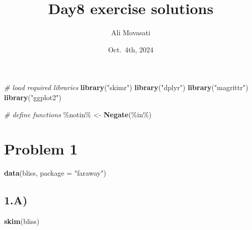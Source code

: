 \documentclass[
]{article}
\title{Day8 exercise solutions}
\author{Ali Movasati}
\date{Oct.~4th, 2024}
\newenvironment{Shaded}{\begin{snugshade}}{\end{snugshade}}
\newcommand{\AttributeTok}[1]{\textcolor[rgb]{0.13,0.29,0.53}{#1}}
\newcommand{\CommentTok}[1]{\textcolor[rgb]{0.56,0.35,0.01}{\textit{#1}}}
\newcommand{\ConstantTok}[1]{\textcolor[rgb]{0.56,0.35,0.01}{#1}}
\newcommand{\FunctionTok}[1]{\textcolor[rgb]{0.13,0.29,0.53}{\textbf{#1}}}
\newcommand{\NormalTok}[1]{#1}
\newcommand{\OtherTok}[1]{\textcolor[rgb]{0.56,0.35,0.01}{#1}}
\newcommand{\SpecialCharTok}[1]{\textcolor[rgb]{0.81,0.36,0.00}{\textbf{#1}}}
\newcommand{\StringTok}[1]{\textcolor[rgb]{0.31,0.60,0.02}{#1}}
\begin{document}
\maketitle

\begin{Shaded}
\end{Shaded}

\begin{Shaded}
\begin{Highlighting}[]
\CommentTok{\# load required libraries}
\FunctionTok{library}\NormalTok{(}\StringTok{"skimr"}\NormalTok{)}
\FunctionTok{library}\NormalTok{(}\StringTok{"dplyr"}\NormalTok{)}
\FunctionTok{library}\NormalTok{(}\StringTok{"magrittr"}\NormalTok{)}
\FunctionTok{library}\NormalTok{(}\StringTok{"ggplot2"}\NormalTok{)}

\CommentTok{\# define functions}
\StringTok{\textasciigrave{}}\AttributeTok{\%notin\%}\StringTok{\textasciigrave{}} \OtherTok{\textless{}{-}} \FunctionTok{Negate}\NormalTok{(}\StringTok{\textasciigrave{}}\AttributeTok{\%in\%}\StringTok{\textasciigrave{}}\NormalTok{)}
\end{Highlighting}
\end{Shaded}

\section{Problem 1}\label{problem-1}

\begin{Shaded}
\begin{Highlighting}[]
\FunctionTok{data}\NormalTok{(bliss, }\AttributeTok{package =} \StringTok{"faraway"}\NormalTok{)}
\end{Highlighting}
\end{Shaded}

\subsection{1.A)}\label{a}

\begin{Shaded}
\begin{Highlighting}[]
\FunctionTok{skim}\NormalTok{(bliss)}
\end{Highlighting}
\end{Shaded}
\end{document}
